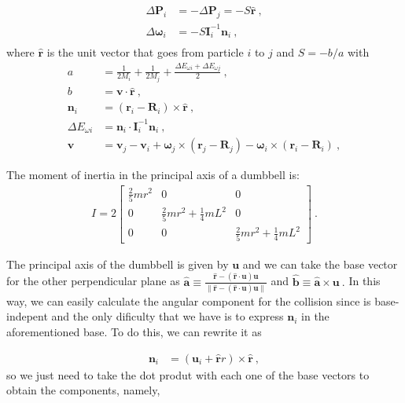 \documentclass[aps,pre,onecolumn,preprint,showpacs]{revtex4}
\begin{document}
\begin{align}
  \Delta \mathbf{P}_i &= -  \Delta \mathbf{P}_j = - S\hat{\mathbf{r}}~,\\
  \Delta \mathbf{\omega}_i &=  - S\mathbf{I}^{-1}_i\mathbf{n}_i~,\\
\end{align}
where $\hat{\mathbf{r}}$ is the unit vector that goes from 
particle $i$ to $j$ and $S = - b/a$ with 
\begin{align}
  a &= \frac{1}{2M_i} + \frac{1}{2M_j} + \frac{\Delta E_{\omega i} + \Delta E_{\omega j}}{2}~,\\
  b &=  \mathbf{v}\cdot \hat{\mathbf{r}}~,\\
  \mathbf{n}_i &= (\mathbf{r}_i-\mathbf{R}_i)\times \hat{\mathbf{r}}~,\\
  \Delta E_{\omega i}  & = \mathbf{n}_i \cdot \mathbf{I}_i^{-1} \mathbf{n}_i~,\\
  \mathbf{v}&= \mathbf{v}_j -\mathbf{v}_i +  \mathbf{\omega}_j\times (\mathbf{r}_j-\mathbf{R}_j) - \mathbf{\omega}_i\times (\mathbf{r}_i-\mathbf{R}_i) ~,
\end{align}

The moment of inertia in the principal axis of a dumbbell is:
\begin{align}
 I = 2
\begin{bmatrix}
  \frac{2}{5} m r^2 & 0 & 0 \\
  0 & \frac{2}{5} m r^2 + \frac{1}{4}mL^2 & 0 \\ 
  0 & 0 & \frac{2}{5} m r^2 + \frac{1}{4}mL^2
\end{bmatrix}~.
\end{align}

The principal axis of the dumbbell is given by $\mathbf{u}$ and we can
take the base vector for the other perpendicular plane as
$\hat{\mathbf{a}} \equiv \frac{\hat{\mathbf{r}} -
  (\hat{\mathbf{r}}\cdot \mathbf{u})  \mathbf{u}}{\| \hat{\mathbf{r}} -
  (\hat{\mathbf{r}}\cdot \mathbf{u})  \mathbf{u}\|}$ and $\hat{\mathbf{b}} \equiv
\hat{\mathbf{a}} \times \mathbf{u}~.$ In this way, we can easily
calculate the angular component for the collision since is
base-indepent and the only dificulty that we have is to express
$\mathbf{n}_i$ in the aforementioned base. To do this, we can rewrite it as

\begin{align}
\mathbf{n}_i   & =  (\mathbf{u}_i+ \hat{\mathbf{r}} r)\times \hat{\mathbf{r}}~,
\end{align}
so we just need to take the dot produt with each one of the base vectors to obtain 
the components, namely, 
\end{document}
